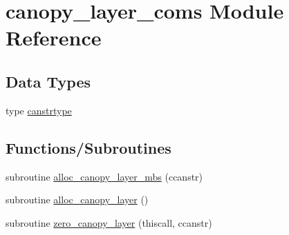 \hypertarget{namespacecanopy__layer__coms}{}\section{canopy\+\_\+layer\+\_\+coms Module Reference}
\label{namespacecanopy__layer__coms}
\subsection*{Data Types}
\begin{DoxyCompactItemize}
\item 
type \hyperlink{structcanopy__layer__coms_1_1canstrtype}{canstrtype}
\end{DoxyCompactItemize}
\subsection*{Functions/\+Subroutines}
\begin{DoxyCompactItemize}
\item 
subroutine \hyperlink{namespacecanopy__layer__coms_ae9d291b6afeedf9357cb7a2b6fa55c89}{alloc\+\_\+canopy\+\_\+layer\+\_\+mbs} (ccanstr)
\item 
subroutine \hyperlink{namespacecanopy__layer__coms_ab4c3f9e7c1af06ec442d70c76e66130b}{alloc\+\_\+canopy\+\_\+layer} ()
\item 
subroutine \hyperlink{namespacecanopy__layer__coms_a35bc9ed614af3affcdbfe5b81f97bb12}{zero\+\_\+canopy\+\_\+layer} (thiscall, ccanstr)
\end{DoxyCompactItemize}
